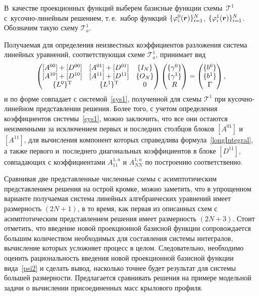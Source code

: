 \documentclass[12pt, a4paper]{article}
\renewcommand{\vec}[1]{\text{\mathversion{bold}${#1}$}}%
\begin{document}
В~качестве проекционных функций выберем базисные функции схемы~$\mathcal{T}^1$ с~кусочно-линейным решением, т.\,е.\ набор функций $\{\varphi_i^0(\vec r)\}_{i=1}^N$, $\{\varphi_i^1(\vec r)\}_{i=1}^{N}$.
Обозначим такую схему $\mathcal{T}^1_a$. 

Получаемая для определения неизвестных коэффициентов разложения система линейных уравнений, соответствующая схеме $\mathcal{T}^1_a$, принимает вид
\begin{equation}
\label{sys1asymplight}
\left(
\begin{array}{@{}ccc@{}}
[A^{00}] + [D^{00}] & [A^{01}] + [D^{01}] & \{I_N\} \\
{[}A^{10}{]} + [D^{10}] & [A^{11}] + [D^{11}] & \{O_N\} \\
\{L^0\}^\mathrm{T} & \{L^1\}^\mathrm{T} & 0
\end{array}
\right)
\left(
\begin{array}{@{}c@{}}
\{\gamma^0\} \\
\{\gamma^1\} \\
R
\end{array}
\right)
=
\left(
\begin{array}{@{}c@{}}
\{b^0\} \\
\{b^1\} \\
\Gamma
\end{array}
\right),
\end{equation}
и по форме совпадает с системой~\eqref{sys1}, полученной для схемы $\mathcal{T}^1$ при кусочно-линейном представлении решения. Более того, с учетом определения коэффициентов системы~\eqref{sys1}, можно заключить, что все они остаются неизменными за исключением первых и последних столбцов блоков $[A^{01}]$ и $[A^{11}]$, для вычисления компонент которых справедлива формула~\eqref{longIntegral}, а также первого и~последнего диагональных коэффициентов в блоке $[D^{11}]$, совпадающих с коэффициентами $ A_{11}^{1,a}$ и $ A_{NN}^{1,a}$ по построению соответственно.

Сравнивая две представленные численные схемы с асимптотическим представлением решения на острой кромке, можно заметить, что в упрощенном варианте получаемая система линейных алгебраических уравнений имеет размерность $(2N+1)$, в то время, как первая из описанных схем с асимптотическим представлением решения имеет размерность $(2N+3)$. Стоит отметить, что введение новой проекционной базисной функции сопровождается большим количеством необходимых для составления системы интегралов, вычисление которых усложняет процесс в целом. Следовательно, необходимо оценить рациональность введения новой проекционной базисной функции вида~\eqref{psi2} и сделать вывод, насколько точнее будет результат для системы большей размерности. Предлагается сравнивать решения на примере модельной задачи о вычислении присоединенных масс крылового профиля.
\end{document}

